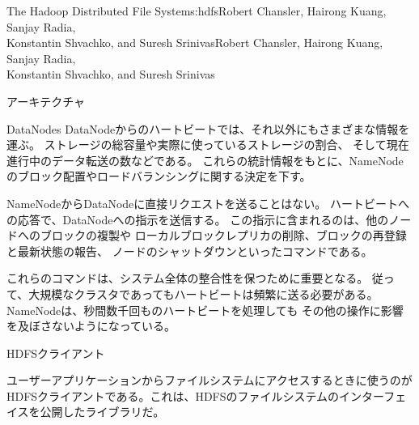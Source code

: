 \begin{aosachaptertoc}{The Hadoop Distributed File System}{s:hdfs}{Robert Chansler, Hairong Kuang, Sanjay Radia, \\ Konstantin Shvachko, and Suresh Srinivas}{Robert Chansler, Hairong Kuang, Sanjay Radia, \\ \hspace*{0.9cm} Konstantin Shvachko, and Suresh Srinivas}
\begin{aosasect1}{アーキテクチャ}
\begin{aosasect2}{DataNodes}
DataNodeからのハートビートでは、それ以外にもさまざまな情報を運ぶ。
ストレージの総容量や実際に使っているストレージの割合、
そして現在進行中のデータ転送の数などである。
これらの統計情報をもとに、NameNodeのブロック配置やロードバランシングに関する決定を下す。

NameNodeからDataNodeに直接リクエストを送ることはない。
ハートビートへの応答で、DataNodeへの指示を送信する。
この指示に含まれるのは、他のノードへのブロックの複製や
ローカルブロックレプリカの削除、ブロックの再登録と最新状態の報告、
ノードのシャットダウンといったコマンドである。

これらのコマンドは、システム全体の整合性を保つために重要となる。
従って、大規模なクラスタであってもハートビートは頻繁に送る必要がある。
NameNodeは、秒間数千回ものハートビートを処理しても
その他の操作に影響を及ぼさないようになっている。

\end{aosasect2}

\begin{aosasect2}{HDFSクライアント}

ユーザーアプリケーションからファイルシステムにアクセスするときに使うのが
HDFSクライアントである。これは、HDFSのファイルシステムのインターフェイスを公開したライブラリだ。


\end{aosasect2}
\end{aosasect1}
\end{aosachaptertoc}
